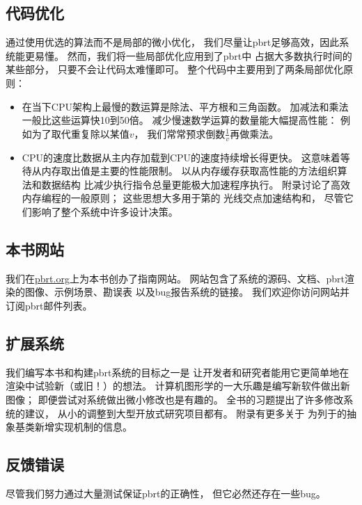 \subsection{代码优化}\label{sub:代码优化}
通过使用优选的算法而不是局部的微小优化，
我们尽量让pbrt足够高效，因此系统能更易懂。
然而，我们将一些局部优化应用到了pbrt中
占据大多数执行时间的某些部分，
只要不会让代码太难懂即可。
整个代码中主要用到了两条局部优化原则：
\begin{itemize}
    \item 在当下CPU架构上最慢的数运算是除法、平方根和三角函数。
          加减法和乘法一般比这些运算快10到50倍。
          减少慢速数学运算的数量能大幅提高性能：
          例如为了取代重复除以某值$v$，
          我们常常预求倒数$\displaystyle\frac{1}{v}$再做乘法。
    \item CPU的速度比数据从主内存加载到CPU的速度持续增长得更快。
          这意味着等待从内存取出值是主要的性能限制。
          以从内存缓存获取高性能的方法组织算法和数据结构
          比减少执行指令总量更能极大加速程序执行。
          附录讨论了高效内存编程的一般原则；
          这些思想大多用于第的
          光线交点加速结构和，
          尽管它们影响了整个系统中许多设计决策。
\end{itemize}

\subsection{本书网站}\label{sub:本书网站}
我们在\href{https://pbrt.org/}{\ttfamily pbrt.org}上为本书创办了指南网站。
网站包含了系统的源码、文档、pbrt渲染的图像、示例场景、勘误表
以及bug报告系统的链接。
我们欢迎你访问网站并订阅pbrt邮件列表。

\subsection{扩展系统}\label{sub:扩展系统}
我们编写本书和构建pbrt系统的目标之一是
让开发者和研究者能用它更简单地在渲染中试验新（或旧！）的想法。
计算机图形学的一大乐趣是编写新软件做出新图像；
即便尝试对系统做出微小修改也是有趣的。
全书的习题提出了许多修改系统的建议，
从小的调整到大型开放式研究项目都有。
附录有更多关于
为列于的抽象基类新增实现机制的信息。

\subsection{反馈错误}\label{sub:反馈错误}
尽管我们努力通过大量测试保证pbrt的正确性，
但它必然还存在一些bug。

